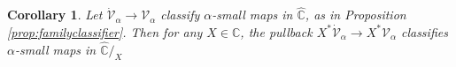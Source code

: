 \documentclass[12pt]{article}
\newcommand{\C}{\ensuremath{\boxempty}}
\newcommand{\bbC}{\ensuremath{\mathbb{C}}}
\newcommand{\Set}{\ensuremath{\mathsf{Set}}}
\newcommand{\Cat}{\ensuremath{\mathsf{Cat}}}
\newcommand{\op}[1]{\ensuremath{{#1}^{\mathrm{op}}}}
\newcommand{\hook}{\ensuremath{\hookrightarrow}}
\newcommand{\mono}{\ensuremath{\rightarrowtail}}
\renewcommand{\to}{\ensuremath{\rightarrow}}
\newcommand{\too}{\ensuremath{\longrightarrow}}
\newcommand{\V}{\ensuremath{\mathcal{V}}}
\newcommand{\VV}{\ensuremath{\dot{\mathcal{V}}}}
\newcommand{\SSet}{\ensuremath{\,\dot{\Set}}}
\newtheorem{corollary}[theorem]{Corollary}
\theoremstyle{remark}
\theoremstyle{definition}
\newcommand{\pbmark}{\ar[dr, phantom, "\lrcorner" very near start, shift right=.5ex]}	%
\begin{document}
\begin{enumerate}
%    
\end{enumerate}

 \begin{corollary}\label{prop:familyclassifierforslices}
Let $\VV_\alpha\to\V_\alpha$ classify $\alpha$-small maps in $\widehat{\bbC}$, as in Proposition \ref{prop:familyclassifier}.  Then for any $X\in \bbC$, the pullback $X^*\VV_\alpha\to X^*\V_\alpha$ classifies 
$\alpha$-small maps in $\widehat{\bbC}/_X$
\end{corollary}
\end{document}

